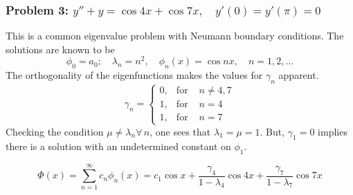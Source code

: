 \subsubsection{Problem 3: $y''+y=\cos{4x} +\cos{7x},\quad y'(0)=y'(\pi)=0$}
This is a common eigenvalue problem with Neumann boundary conditions. The solutions are known to be
\begin{equation*}
    \phi_0=a_0; \quad \lambda_n=n^2, \quad \phi_n(x) = \cos{nx}, \quad n=1,2,\dots
\end{equation*}
The orthogonality of the eigenfunctions makes the values for $\gamma_n$ apparent.
\begin{equation*}
    \gamma_n = \left\{\begin{array}{rrl}
        0, &  \text{for } & n \neq 4,7 \\
        1, &  \text{for } & n = 4 \\
        1, &  \text{for } & n = 7
        \end{array}\right. 
\end{equation*}
Checking the condition $\mu\neq\lambda_n \forall \,n$, one sees that $\lambda_1=\mu=1$. But, $\gamma_1=0$ implies there is a solution with an undetermined constant on $\phi_1$.

\begin{equation*}
    \Phi(x) = \sum_{n=1}^\infty c_n \phi_n(x) = c_1\cos{x} + \frac{\gamma_4}{1-\lambda_4}\cos{4x} + \frac{\gamma_7}{1-\lambda_7}\cos{7x}
\end{equation*}
